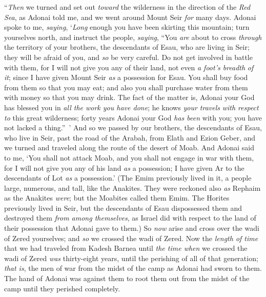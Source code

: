 \begin{biblechapter} %
\verse “\textit{Then} we turned and set out \textit{toward} the wilderness in the direction of the \textit{Red Sea}, as Adonai told me, and we went around Mount Seir \textit{for} many days.
\verse Adonai spoke to me, \textit{saying},
\verse ‘\textit{Long} enough you have been skirting this mountain; turn yourselves north,
\verse and instruct the people, \textit{saying}, “You \textit{are} about to cross \textit{through} the territory of your brothers, the descendants of Esau, who are living in Seir; they will be afraid of you, and \textit{so} be very careful.
\verse Do not get involved in battle with them, for I will not give you any of their land, not even \textit{a foot’s breadth} \textit{of it}; since I have given Mount Seir \textit{as} a possession for Esau.
\verse You shall buy food from them so that you may eat; and also you shall purchase water from them with money so that you may drink.
\verse The fact of the matter is, Adonai your God has blessed you in \textit{all the work you have done}; he knows \textit{your travels} \textit{with respect to} this great wilderness; forty years Adonai your God \textit{has been} with you; you have not lacked a thing.” ’
\verse And so we passed by our brothers, the descendants of Esau, who live in Seir, past the road of the Arabah, from Elath and Ezion Geber, and we turned and traveled along the route of the desert of Moab.
\verse And Adonai said to me, ‘You shall not attack Moab, and you shall not engage in war with them, for I will not give you any of his land \textit{as} a possession; I have given Ar to the descendants of Lot \textit{as} a possession.’
\verse (The Emim previously lived in it, a people large, numerous, and tall, like the Anakites.
\verse They were reckoned also \textit{as} Rephaim as the Anakites \textit{were}; but the Moabites called them Emim.
\verse The Horites previously lived in Seir, but the descendants of Esau dispossessed them and destroyed them \textit{from among themselves}, as Israel did with respect to the land of their possession that Adonai gave to them.)
\verse So \textit{now} arise and cross over the wadi of Zered yourselves; and \textit{so} we crossed the wadi of Zered.
\verse Now the \textit{length of time} that we had traveled from Kadesh Barnea until \textit{the time when} we crossed the wadi of Zered \textit{was} thirty-eight years, until the perishing of all of that generation; \textit{that is}, the men of war from the midst of the camp as Adonai had sworn to them.
\verse The hand of Adonai was against them to root them out from the midst of the camp until they perished completely.

\end{biblechapter}
